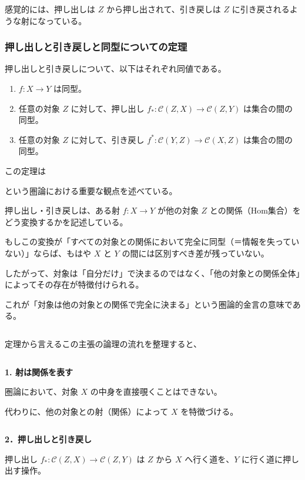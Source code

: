 \documentclass[uplatex,a4j,12pt,dvipdfmx]{jsarticle}
\begin{document}
感覚的には、押し出しは $Z$ から押し出されて、引き戻しは $Z$ に引き戻されるような射になっている。



\subsubsection{押し出しと引き戻しと同型についての定理}

押し出しと引き戻しについて、以下はそれぞれ同値である。

\begin{enumerate}
    \item $f : X \to Y$ は同型。
    \item 任意の対象 $Z$ に対して、押し出し $f_{*} : \mathcal{C}(Z,X) \to \mathcal{C}(Z,Y)$ は集合の間の同型。
    \item 任意の対象 $Z$ に対して、引き戻し $f^{*} :\mathcal{C}(Y,Z) \to \mathcal{C}(X,Z)$ は集合の間の同型。
\end{enumerate}

この定理は

\begin{center}
\end{center}

という圏論における重要な観点を述べている。

押し出し・引き戻しは、ある射 $f: X \to Y$ が他の対象 $Z$ との関係（Hom集合）をどう変換するかを記述している。

もしこの変換が「すべての対象との関係において完全に同型（＝情報を失っていない）」ならば、もはや $X$ と $Y$ の間には区別すべき差が残っていない。

したがって、対象は「自分だけ」で決まるのではなく、「他の対象との関係全体」によってその存在が特徴付けられる。

これが「対象は他の対象との関係で完全に決まる」という圏論的金言の意味である。

${}$

定理から言えるこの主張の論理の流れを整理すると、

${}$

{\bf 1. 射は関係を表す}

圏論において、対象 $X$ の中身を直接覗くことはできない。

代わりに、他の対象との射（関係）によって $X$ を特徴づける。

${}$

{\bf 2．押し出しと引き戻し}

押し出し $f_{*} : \mathcal{C}(Z,X) \to \mathcal{C}(Z,Y)$ は
$Z$ から $X$ へ行く道を、$Y$ に行く道に押し出す操作。
\end{document}
